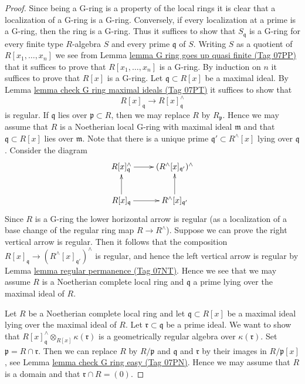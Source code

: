\documentclass{amsart}
\theoremstyle{plain}
\theoremstyle{definition}
\theoremstyle{remark}
\numberwithin{equation}{subsection}
\begin{document}
\begin{proof}
Since being a G-ring is a property of the local rings it is clear
that a localization of a G-ring is a G-ring. Conversely, if every
localization at a prime is a G-ring, then the ring is a G-ring.
Thus it suffices to show that $S_\mathfrak q$ is a G-ring for every
finite type $R$-algebra $S$ and every prime $\mathfrak q$ of $S$.
Writing $S$ as a quotient of $R[x_1, \ldots, x_n]$ we see from
Lemma \href{https://stacks.math.columbia.edu/tag/07PP}{lemma G ring goes up quasi finite (Tag 07PP)} that it suffices to prove
that $R[x_1, \ldots, x_n]$ is a G-ring. By induction on $n$ it
suffices to prove that $R[x]$ is a G-ring. Let $\mathfrak q \subset R[x]$
be a maximal ideal. By Lemma \href{https://stacks.math.columbia.edu/tag/07PT}{lemma check G ring maximal ideals (Tag 07PT)}
it suffices to show that
$$
R[x]_\mathfrak q \longrightarrow R[x]_\mathfrak q^\wedge
$$
is regular. If $\mathfrak q$ lies over $\mathfrak p \subset R$, then
we may replace $R$ by $R_\mathfrak p$. Hence we may assume that $R$
is a Noetherian local G-ring with maximal ideal $\mathfrak m$ and
that $\mathfrak q \subset R[x]$ lies over $\mathfrak m$. Note that
there is a unique prime $\mathfrak q' \subset R^\wedge[x]$
lying over $\mathfrak q$. Consider the diagram
$$
\xymatrix{
R[x]_\mathfrak q^\wedge \ar[r] &
(R^\wedge[x]_{\mathfrak q'})^\wedge \\
R[x]_\mathfrak q \ar[r] \ar[u] & R^\wedge[x]_{\mathfrak q'} \ar[u]
}
$$
Since $R$ is a G-ring the lower horizontal arrow is regular
(as a localization of a base change of the regular ring map
$R \to R^\wedge$). Suppose we can prove the right vertical arrow
is regular. Then it follows that the composition
$R[x]_\mathfrak q \to (R^\wedge[x]_{\mathfrak q'})^\wedge$
is regular, and hence the left vertical arrow is regular by
Lemma \href{https://stacks.math.columbia.edu/tag/07NT}{lemma regular permanence (Tag 07NT)}.
Hence we see that we may assume $R$ is a Noetherian complete
local ring and $\mathfrak q$ a prime lying over the maximal
ideal of $R$.

\medskip\noindent
Let $R$ be a Noetherian complete local ring and let $\mathfrak q \subset R[x]$
be a maximal ideal lying over the maximal ideal of $R$. Let
$\mathfrak r \subset \mathfrak q$ be a prime ideal. We want to show that
$R[x]_\mathfrak q^\wedge \otimes_{R[x]} \kappa(\mathfrak r)$ is
a geometrically regular algebra over $\kappa(\mathfrak r)$.
Set $\mathfrak p = R \cap \mathfrak r$. Then we can replace $R$
by $R/\mathfrak p$ and $\mathfrak q$ and $\mathfrak r$ by their
images in $R/\mathfrak p[x]$, see
Lemma \href{https://stacks.math.columbia.edu/tag/07PN}{lemma check G ring easy (Tag 07PN)}.
Hence we may assume that $R$ is a domain and that $\mathfrak r \cap R = (0)$.


\end{proof}
\end{document}
